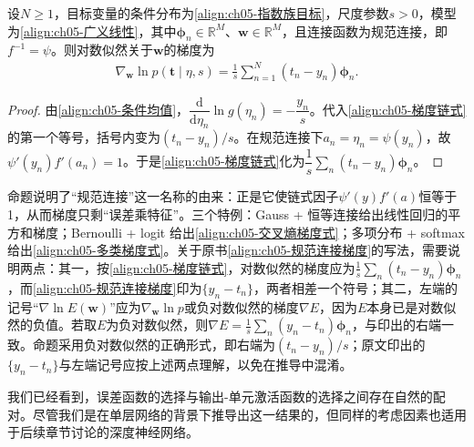 \documentclass[../../main.tex]{subfiles}
\begin{document}
\begin{proposition}[规范连接下的梯度化简]\label{proposition:ch05-规范连接梯度}
设$N\geqslant1$，目标变量的条件分布为\eqref{align:ch05-指数族目标}，尺度参数$s>0$，模型为\eqref{align:ch05-广义线性}，其中$\boldsymbol{\phi}_n\in\mathbb{R}^{M}$、$\boldsymbol{w}\in\mathbb{R}^{M}$，且连接函数为规范连接，即$f^{-1}=\psi$。则对数似然关于$\boldsymbol{w}$的梯度为
\begin{align}
  \nabla_{\boldsymbol{w}}\ln p(\boldsymbol{t}\mid\eta,s)=\frac{1}{s}\sum_{n=1}^{N}\left(t_n-y_n\right)\boldsymbol{\phi}_n.
\end{align}
\end{proposition}

\begin{proof}
由\eqref{align:ch05-条件均值}，$\dfrac{\mathrm{d}}{\mathrm{d}\eta_n}\ln g(\eta_n)=-\dfrac{y_n}{s}$。代入\eqref{align:ch05-梯度链式}的第一个等号，括号内变为$(t_n-y_n)/s$。在规范连接下$a_n=\eta_n=\psi(y_n)$，故$\psi'(y_n)f'(a_n)=1$。于是\eqref{align:ch05-梯度链式}化为$\dfrac{1}{s}\sum_n(t_n-y_n)\boldsymbol{\phi}_n$。
\end{proof}

\begin{remark}
命题说明了“规范连接”这一名称的由来：正是它使链式因子$\psi'(y)f'(a)$恒等于1，从而梯度只剩“误差乘特征”。三个特例：Gauss + 恒等连接给出线性回归的平方和梯度；Bernoulli + logit 给出\eqref{align:ch05-交叉熵梯度式}；多项分布 + softmax 给出\eqref{align:ch05-多类梯度式}。关于原书\eqref{align:ch05-规范连接梯度}的写法，需要说明两点：其一，按\eqref{align:ch05-梯度链式}，对数似然的梯度应为$\frac{1}{s}\sum_n(t_n-y_n)\boldsymbol{\phi}_n$，而\eqref{align:ch05-规范连接梯度}印为$\{y_n-t_n\}$，两者相差一个符号；其二，左端的记号“$\nabla\ln E(\boldsymbol{w})$”应为$\nabla_{\boldsymbol{w}}\ln p$或负对数似然的梯度$\nabla E$，因为$E$本身已是对数似然的负值。若取$E$为负对数似然，则$\nabla E=\frac{1}{s}\sum_n(y_n-t_n)\boldsymbol{\phi}_n$，与印出的右端一致。命题采用负对数似然的正确形式，即右端为$(t_n-y_n)/s$；原文印出的$\{y_n-t_n\}$与左端记号应按上述两点理解，以免在推导中混淆。
\end{remark}

我们已经看到，误差函数的选择与输出-单元激活函数的选择之间存在自然的配对。尽管我们是在单层网络的背景下推导出这一结果的，但同样的考虑因素也适用于后续章节讨论的深度神经网络。
\end{document}
